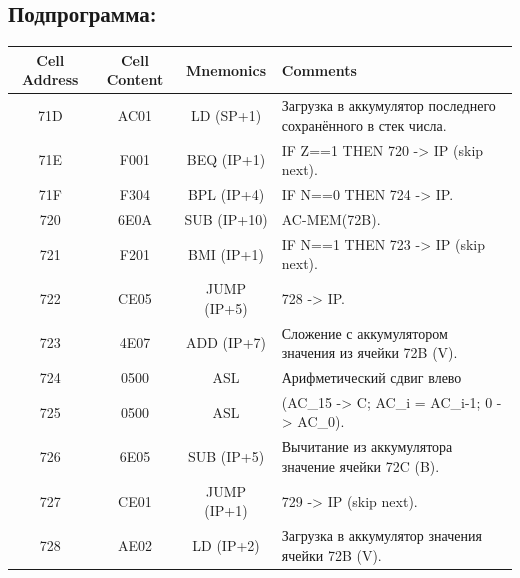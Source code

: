 \newpage

\subsection{Подпрограмма:}
\begin{center}
    \begin{tabular}{|c|c|c|l|}
        \hline
        \textbf{Cell Address} & \textbf{Cell Content} & \textbf{Mnemonics} & \textbf{Comments}                                            \\
        \hline
        71D                   & AC01                  & LD (SP+1)          & Загрузка в аккумулятор последнего сохранённого в стек числа. \\
        71E                   & F001                  & BEQ (IP+1)         & IF Z==1 THEN 720 -> IP (skip next).                          \\
        71F                   & F304                  & BPL (IP+4)         & IF N==0 THEN 724 -> IP.                                      \\
        720                   & 6E0A                  & SUB (IP+10)        & AC-MEM(72B).                                                 \\
        721                   & F201                  & BMI (IP+1)         & IF N==1 THEN 723 -> IP (skip next).                          \\
        722                   & CE05                  & JUMP (IP+5)        & 728 -> IP.                                                   \\
        723                   & 4E07                  & ADD (IP+7)         & Сложение с аккумулятором значения из ячейки 72B (V).         \\
        724                   & 0500                  & ASL                & Арифметический сдвиг влево                                   \\
        725                   & 0500                  & ASL                & (AC_{15} -> C; AC_{i} = AC_{i-1}; 0 -> AC_{0}).              \\
        726                   & 6E05                  & SUB (IP+5)         & Вычитание из аккумулятора значение ячейки 72C (B).           \\
        727                   & CE01                  & JUMP (IP+1)        & 729 -> IP (skip next).                                       \\
        728                   & AE02                  & LD (IP+2)          & Загрузка в аккумулятор значения ячейки 72B (V).              \\

\end{tabular}
\end{center}
